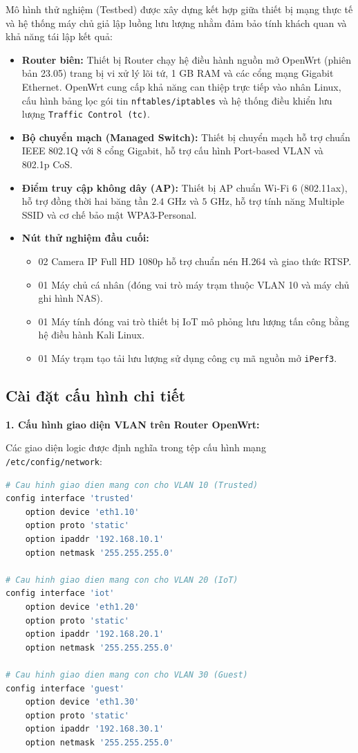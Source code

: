 Mô hình thử nghiệm (Testbed) được xây dựng kết hợp giữa thiết bị mạng thực tế và hệ thống máy chủ giả lập luồng lưu lượng nhằm đảm bảo tính khách quan và khả năng tái lập kết quả:
\begin{itemize}
    \item \textbf{Router biên:} Thiết bị Router chạy hệ điều hành nguồn mở OpenWrt (phiên bản 23.05) trang bị vi xử lý lõi tứ, 1 GB RAM và các cổng mạng Gigabit Ethernet. OpenWrt cung cấp khả năng can thiệp trực tiếp vào nhân Linux, cấu hình bảng lọc gói tin \texttt{nftables/iptables} và hệ thống điều khiển lưu lượng \texttt{Traffic Control (tc)}.
    \item \textbf{Bộ chuyển mạch (Managed Switch):} Thiết bị chuyển mạch hỗ trợ chuẩn IEEE 802.1Q với 8 cổng Gigabit, hỗ trợ cấu hình Port-based VLAN và 802.1p CoS.
    \item \textbf{Điểm truy cập không dây (AP):} Thiết bị AP chuẩn Wi-Fi 6 (802.11ax), hỗ trợ đồng thời hai băng tần $2.4\text{ GHz}$ và $5\text{ GHz}$, hỗ trợ tính năng Multiple SSID và cơ chế bảo mật WPA3-Personal.
    \item \textbf{Nút thử nghiệm đầu cuối:}
    \begin{itemize}
        \item 02 Camera IP Full HD 1080p hỗ trợ chuẩn nén H.264 và giao thức RTSP.
        \item 01 Máy chủ cá nhân (đóng vai trò máy trạm thuộc VLAN 10 và máy chủ ghi hình NAS).
        \item 01 Máy tính đóng vai trò thiết bị IoT mô phỏng lưu lượng tấn công bằng hệ điều hành Kali Linux.
        \item 01 Máy trạm tạo tải lưu lượng sử dụng công cụ mã nguồn mở \texttt{iPerf3}.
    \end{itemize}
\end{itemize}

\subsection{Cài đặt cấu hình chi tiết}
\label{subsec:cau-hinh-chi-tiet}

\textbf{1. Cấu hình giao diện VLAN trên Router OpenWrt:}

Các giao diện logic được định nghĩa trong tệp cấu hình mạng \texttt{/etc/config/network}:
\begin{lstlisting}[language=bash]
# Cau hinh giao dien mang con cho VLAN 10 (Trusted)
config interface 'trusted'
    option device 'eth1.10'
    option proto 'static'
    option ipaddr '192.168.10.1'
    option netmask '255.255.255.0'

# Cau hinh giao dien mang con cho VLAN 20 (IoT)
config interface 'iot'
    option device 'eth1.20'
    option proto 'static'
    option ipaddr '192.168.20.1'
    option netmask '255.255.255.0'

# Cau hinh giao dien mang con cho VLAN 30 (Guest)
config interface 'guest'
    option device 'eth1.30'
    option proto 'static'
    option ipaddr '192.168.30.1'
    option netmask '255.255.255.0'
\end{lstlisting}

